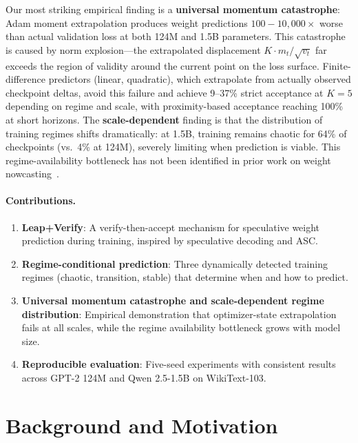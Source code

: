 \documentclass{article}
\begin{document}
Our most striking empirical finding is a \textbf{universal momentum catastrophe}: Adam moment extrapolation produces weight predictions $100{-}10{,}000\times$ worse than actual validation loss at both 124M and 1.5B parameters.
This catastrophe is caused by norm explosion---the extrapolated displacement $K \cdot m_t / \sqrt{v_t}$ far exceeds the region of validity around the current point on the loss surface.
Finite-difference predictors (linear, quadratic), which extrapolate from actually observed checkpoint deltas, avoid this failure and achieve 9--37\% strict acceptance at $K{=}5$ depending on regime and scale, with proximity-based acceptance reaching 100\% at short horizons.
The \textbf{scale-dependent} finding is that the distribution of training regimes shifts dramatically: at 1.5B, training remains chaotic for 64\% of checkpoints (vs.\ 4\% at 124M), severely limiting when prediction is viable.
This regime-availability bottleneck has not been identified in prior work on weight nowcasting~\citep{jang2023wnn,knyazev2025nino,guan2024xgrad}.

\paragraph{Contributions.}
\begin{enumerate}
    \item \textbf{Leap+Verify}: A verify-then-accept mechanism for speculative weight prediction during training, inspired by speculative decoding and ASC.
    \item \textbf{Regime-conditional prediction}: Three dynamically detected training regimes (chaotic, transition, stable) that determine when and how to predict.
    \item \textbf{Universal momentum catastrophe and scale-dependent regime distribution}: Empirical demonstration that optimizer-state extrapolation fails at all scales, while the regime availability bottleneck grows with model size.
    \item \textbf{Reproducible evaluation}: Five-seed experiments with consistent results across GPT-2 124M and Qwen 2.5-1.5B on WikiText-103.
\end{enumerate}

\section{Background and Motivation}
\label{sec:background}
\end{document}
